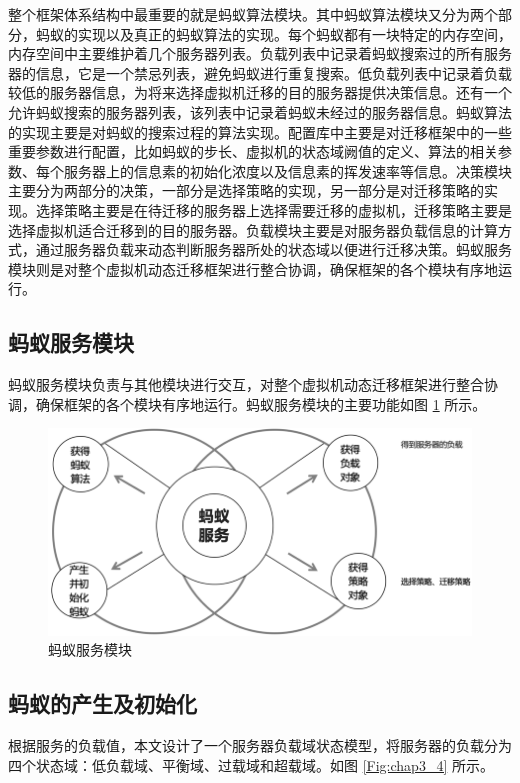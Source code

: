 整个框架体系结构中最重要的就是蚂蚁算法模块。其中蚂蚁算法模块又分为两个部分，蚂蚁的实现以及真正的蚂蚁算法的实现。每个蚂蚁都有一块特定的内存空间，内存空间中主要维护着几个服务器列表。负载列表中记录着蚂蚁搜索过的所有服务器的信息，它是一个禁忌列表，避免蚂蚁进行重复搜索。低负载列表中记录着负载较低的服务器信息，为将来选择虚拟机迁移的目的服务器提供决策信息。还有一个允许蚂蚁搜索的服务器列表，该列表中记录着蚂蚁未经过的服务器信息。蚂蚁算法的实现主要是对蚂蚁的搜索过程的算法实现。配置库中主要是对迁移框架中的一些重要参数进行配置，比如蚂蚁的步长、虚拟机的状态域阙值的定义、算法的相关参数、每个服务器上的信息素的初始化浓度以及信息素的挥发速率等信息。决策模块主要分为两部分的决策，一部分是选择策略的实现，另一部分是对迁移策略的实现。选择策略主要是在待迁移的服务器上选择需要迁移的虚拟机，迁移策略主要是选择虚拟机适合迁移到的目的服务器。负载模块主要是对服务器负载信息的计算方式，通过服务器负载来动态判断服务器所处的状态域以便进行迁移决策。蚂蚁服务模块则是对整个虚拟机动态迁移框架进行整合协调，确保框架的各个模块有序地运行。

\subsection{蚂蚁服务模块}
蚂蚁服务模块负责与其他模块进行交互，对整个虚拟机动态迁移框架进行整合协调，确保框架的各个模块有序地运行。蚂蚁服务模块的主要功能如图 \ref{Fig:chap3_3} 所示。

\begin{figure}[htb]
  \centering
  \includegraphics{./Figure/IMG_Chap3_3.png}
  \caption{蚂蚁服务模块}\label{Fig:chap3_3}
\end{figure}

\subsection{蚂蚁的产生及初始化}
根据服务的负载值，本文设计了一个服务器负载域状态模型，将服务器的负载分为四个状态域：低负载域、平衡域、过载域和超载域。如图 \ref{Fig:chap3_4} 所示。

